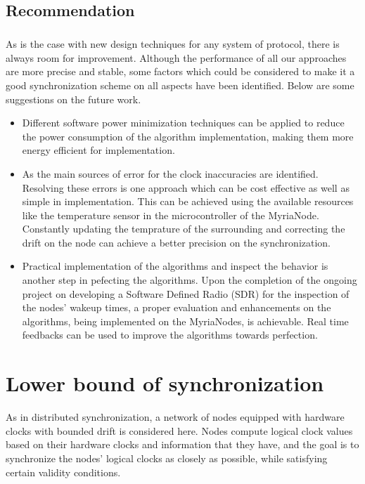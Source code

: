 \documentclass[a4paper,10pt]{report}
\begin{document}
\section{\textbf{Recommendation}}
\paragraph*{}
As is the case with new design techniques for any system of protocol, there is always room for improvement. Although the performance of all our approaches are more precise and stable,  some factors which could be considered to make it a good synchronization scheme on all aspects have been identified. Below are some suggestions on the future work.
\begin{itemize}
\item
Different software power minimization techniques can be applied to reduce the power consumption of the algorithm implementation, making them more energy efficient for implementation.
\item  As the main sources of error for the clock inaccuracies are identified. Resolving these errors is one approach which can be cost effective as well as simple in implementation. This can be achieved using the available resources like the temperature sensor in the microcontroller of the MyriaNode. Constantly updating the temprature of the surrounding and correcting the drift on the node can achieve a better precision on the synchronization.
\item
Practical implementation of the algorithms and inspect the behavior is another step in pefecting the algorithms. Upon the completion of the ongoing project on developing a Software Defined Radio (SDR) for the inspection of the nodes' wakeup times, a proper evaluation and enhancements on the algorithms, being implemented on the MyriaNodes, is achievable. Real time feedbacks can be used to improve the algorithms towards perfection.
\end{itemize}
\appendix
\chapter{\textbf{Lower bound of synchronization}}
As in distributed synchronization, a network of nodes equipped with hardware clocks with bounded drift is considered
here. Nodes compute logical clock values based on their hardware clocks and information that they have, and the goal is to
synchronize the nodes' logical clocks as closely as possible, while satisfying certain validity conditions.
\end{document}
